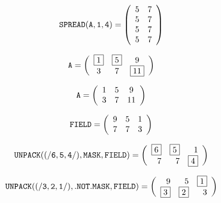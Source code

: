 \documentclass{article}
\begin{document}
{\newpage
\clearpage
\samepage \begin{displaymath}{\tt SPREAD}{\tt (A,1,4)} = 
\left(
\begin{array}{rr} 
5 &  7  \\  
5 &  7  \\  
5 &  7  \\  
5 &  7
\end{array}
\right)
\end{displaymath}
}

{\newpage
\clearpage
\samepage \begin{displaymath}{\tt A} = 
\left(
\begin{array}{ccc}
\fbox{1} & \fbox{5} & 9 \\  
3 & 7 & \fbox{11}
\end{array}
\right)
\end{displaymath}
}

{\newpage
\clearpage
\samepage \begin{displaymath}{\tt A} = 
\left(
\begin{array}{ccc}
1 & 5 & 9 \\  
3 & 7 & 11
\end{array}
\right)
\end{displaymath}
}

{\newpage
\clearpage
\samepage \begin{displaymath}{\tt FIELD} = 
\left(
\begin{array}{rrr}
    9 & 5 & 1 \\  
    7 & 7 & 3
\end{array}
\right)
\end{displaymath}
}

{\newpage
\clearpage
\samepage \begin{displaymath}{\tt UNPACK((/6,5,4/),MASK,FIELD)} = 
\left(
\begin{array}{rrr}
\fbox{6} &  \fbox{5} &  1 \\  
7 &  7 &  \fbox{4}
\end{array}
\right)
\end{displaymath}
}

{\newpage
\clearpage
\samepage \begin{displaymath}{\tt UNPACK((/3,2,1/),.NOT.MASK,FIELD)} = 
\left(
\begin{array}{rrr}
9 &  5 &  \fbox{1}\\  
\fbox{3} &  \fbox{2} &  3
\end{array}
\right)
\end{displaymath}
}
\end{document}
